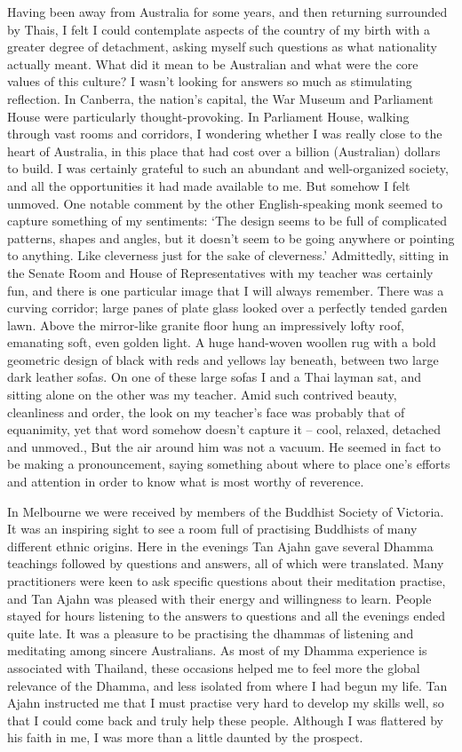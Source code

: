 Having been away from Australia for some years, and then returning
surrounded by Thais, I felt I could contemplate aspects of the country
of my birth with a greater degree of detachment, asking myself such
questions as what nationality actually meant. What did it mean to be
Australian and what were the core values of this culture? I wasn't
looking for answers so much as stimulating reflection. In Canberra, the
nation's capital, the War Museum and Parliament House were particularly
thought-provoking. In Parliament House, walking through vast rooms and
corridors, I wondering whether I was really close to the heart of
Australia, in this place that had cost over a billion (Australian) 
dollars to build. I was certainly grateful to such an abundant and
well-organized society, and all the opportunities it had made available
to me. But somehow I felt unmoved. One notable comment by the other
English-speaking monk seemed to capture something of my sentiments: `The
design seems to be full of complicated patterns, shapes and angles, but
it doesn't seem to be going anywhere or pointing to anything. Like
cleverness just for the sake of cleverness.' Admittedly, sitting in the
Senate Room and House of Representatives with my teacher was certainly
fun, and there is one particular image that I will always remember. 
There was a curving corridor; large panes of plate glass looked over a
perfectly tended garden lawn. Above the mirror-like granite floor hung
an impressively lofty roof, emanating soft, even golden light. A huge
hand-woven woollen rug with a bold geometric design of black with reds
and yellows lay beneath, between two large dark leather sofas. On one of
these large sofas I and a Thai layman sat, and sitting alone on the
other was my teacher. Amid such contrived beauty, cleanliness and order, 
the look on my teacher's face was probably that of equanimity, yet that
word somehow doesn't capture it -- cool, relaxed, detached and unmoved., 
But the air around him was not a vacuum. He seemed in fact to be making
a pronouncement, saying something about where to place one's efforts and
attention in order to know what is most worthy of reverence. 

In Melbourne we were received by members of the Buddhist Society of
Victoria. It was an inspiring sight to see a room full of practising
Buddhists of many different ethnic origins. Here in the evenings Tan
Ajahn gave several Dhamma teachings followed by questions and answers, 
all of which were translated. Many practitioners were keen to ask
specific questions about their meditation practise, and Tan Ajahn was
pleased with their energy and willingness to learn. People stayed for
hours listening to the answers to questions and all the evenings ended
quite late. It was a pleasure to be practising the dhammas of listening
and meditating among sincere Australians. As most of my Dhamma
experience is associated with Thailand, these occasions helped me to
feel more the global relevance of the Dhamma, and less isolated from
where I had begun my life. Tan Ajahn instructed me that I must practise
very hard to develop my skills well, so that I could come back and truly
help these people. Although I was flattered by his faith in me, I was
more than a little daunted by the prospect. 


